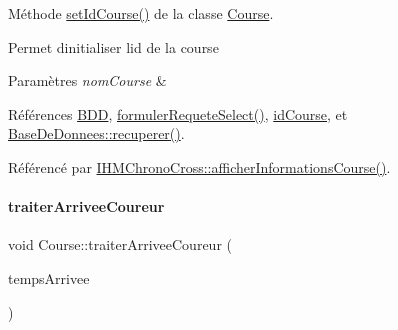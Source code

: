 Méthode \hyperlink{class_course_a36cf16c971841431947b6fbe2b3f3d27}{set\+Id\+Course()} de la classe \hyperlink{class_course}{Course}. 

Permet d\textquotesingle{}initialiser l\textquotesingle{}id de la course 
\begin{DoxyParams}{Paramètres}
{\em nom\+Course} & \\
\hline
\end{DoxyParams}


Références \hyperlink{class_course_a28a58b06494361b7a7eb81844d571dd4}{B\+DD}, \hyperlink{class_course_a2ce9c62ead2c878a30af9d9c11b81644}{formuler\+Requete\+Select()}, \hyperlink{class_course_a1f80798e50be6db9911a882a2491c698}{id\+Course}, et \hyperlink{class_base_de_donnees_a77539baad389f5acf754cd2cd452403e}{Base\+De\+Donnees\+::recuperer()}.



Référencé par \hyperlink{class_i_h_m_chrono_cross_afe18e84e4df15c15921f2bdcfc6f4396}{I\+H\+M\+Chrono\+Cross\+::afficher\+Informations\+Course()}.


\mbox{\label{class_course_a60073d16efd4ccefa81bddb4aaa88fab}} 
\paragraph{\texorpdfstring{traiter\+Arrivee\+Coureur}{traiterArriveeCoureur}}
{\footnotesize\ttfamily void Course\+::traiter\+Arrivee\+Coureur (\begin{DoxyParamCaption}\item[{Q\+String}]{temps\+Arrivee }\end{DoxyParamCaption})\hspace{0.3cm}{\ttfamily [slot]}}



